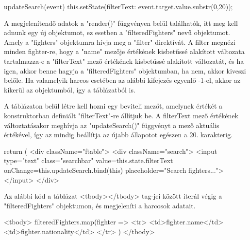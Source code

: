 \begin{cpp}
updateSearch(event){
    this.setState({filterText: event.target.value.substr(0,20)}); }
\end{cpp}

A megjelenítendő adatok a "render()" függvényen belül találhatók, itt meg kell adnunk egy új objektumot, ez esetben a "filteredFighters" nevű objektumot. Amely a "fighters" objektumra hívja meg a "filter" direktívát. A filter megnézi minden fighter-re, hogy a "name" mezője értékének kisbetűssé alakított változata tartalmazza-e a "filterText" mező értékének kisbetűssé alakított változatát, és ha igen, akkor benne hagyja a "filteredFighters" objektumban, ha nem, akkor kiveszi belőle. Ha valamelyik harcos esetében az alábbi kifejezés egyenlő -1-el, akkor az kikerül az objektumból, így a táblázatból is.

\begin{cpp}
render() {
 let filteredFighters = this.state.fighters.filter(
  (fighter) => {
   return fighter.name.toLowerCase()
   .indexOf(this.state.filterText.toLowerCase()) !== -1;
 }
);
\end{cpp}

A táblázaton belül létre kell hozni egy beviteli mezőt, amelynek értékét a konstruktorban definiált "filterText"-re állítjuk be. A filterText mező értékének változtatásakor meghívja az
"updateSearch()" függvényt a mező aktuális értékével, így az mindig beállítja az újabb állapotot egészen a 20. karakterig.

\begin{cpp}
return (
  <div className="ftable">
    <div className="search">
      <input type="text" class="searchbar" value={this.state.filterText} 					   onChange={this.updateSearch.bind(this)} placeholder="Search fighters...">
      </input>
  </div>
\end{cpp}

Az alábbi kód a táblázat <tbody></tbody> tag-jei között iterál végig a "filteredFighters" objektumon, és megjeleníti a harcosok adatait.

\begin{cpp}
<tbody>
{filteredFighters.map(fighter =>
<tr>
	<td>{fighter.name}</td>
	<td>{fighter.nationality}</td>
</tr>
)}
</tbody>
\end{cpp}



